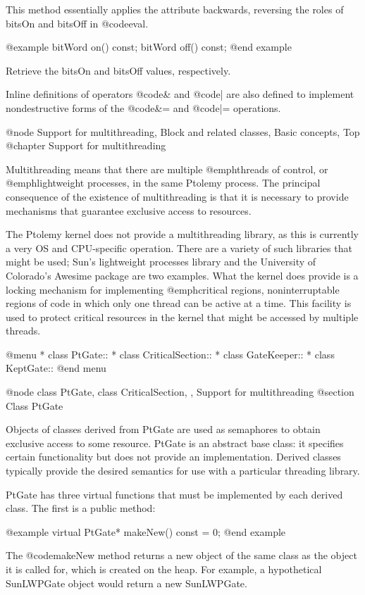 This method essentially applies the attribute backwards, reversing
the roles of bitsOn and bitsOff in @code{eval}.

@example
bitWord on() const;
bitWord off() const;
@end example

Retrieve the bitsOn and bitsOff values, respectively.

Inline definitions of operators @code{&} and @code{|} are also defined
to implement nondestructive forms of the @code{&=} and @code{|=}
operations.

@node Support for multithreading, Block and related classes, Basic concepts, Top
@chapter Support for multithreading

Multithreading means that there are multiple @emph{threads of control},
or @emph{lightweight processes}, in the same Ptolemy process.  The
principal consequence of the existence of multithreading is that it is
necessary to provide mechanisms that guarantee exclusive access to
resources.

The Ptolemy kernel does not provide a multithreading library, as this
is currently a very OS and CPU-specific operation.  There are a variety
of such libraries that might be used; Sun's lightweight processes
library and the University of Colorado's Awesime package are two
examples.  What the kernel does provide is a locking mechanism for
implementing @emph{critical regions}, noninterruptable regions of code
in which only one thread can be active at a time.  This facility is used
to protect critical resources in the kernel that might be accessed by
multiple threads.

@menu
* class PtGate::    
* class CriticalSection::  
* class GateKeeper::  
* class KeptGate::  
@end menu

@node class PtGate, class CriticalSection,  , Support for multithreading
@section Class PtGate

Objects of classes derived from PtGate are used as semaphores to obtain
exclusive access to some resource.  PtGate is an abstract base class: it
specifies certain functionality but does not provide an implementation.
Derived classes typically provide the desired semantics for use with a
particular threading library.

PtGate has three virtual functions that must be implemented by each
derived class.  The first is a public method:

@example
virtual PtGate* makeNew() const = 0;
@end example

The @code{makeNew} method returns a new object of the same class as the
object it is called for, which is created on the heap.  For example, a
hypothetical SunLWPGate object would return a new SunLWPGate.

